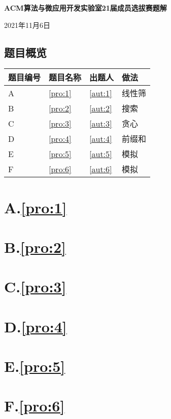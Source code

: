 \documentclass[
	lang=cn,
	color=blue
]{elegantbook}
\begin{document}
\begin{titlepage}
    \begin{center}
		\LARGE
		\textbf{ACM算法与微应用开发实验室21届成员选拔赛题解} \par
		\normalsize
		\vspace{0.5cm}
		2021年11月6日
	\end{center}

    \section*{题目概览}
    \begin{center}
        \begin{tabularx}{\textwidth}{M|M|M|M}
            \toprule
            \textbf{题目编号} & \textbf{题目名称} &\textbf{出题人} & \textbf{做法} \\
            \midrule
            A & \ref*{pro:1} & \ref*{aut:1} &线性筛 \\
            B & \ref*{pro:2} & \ref*{aut:2} &搜索 \\
            C & \ref*{pro:3} & \ref*{aut:3} &贪心 \\
            D & \ref*{pro:4} & \ref*{aut:4} &前缀和 \\
            E & \ref*{pro:5} & \ref*{aut:5} &模拟 \\
            F & \ref*{pro:6} & \ref*{aut:6} &模拟\\
            \bottomrule
        \end{tabularx}
    \end{center}
\end{titlepage}

\chapter*{A.\quad \ref*{pro:1}}

\chapter*{B.\quad \ref*{pro:2}}

\chapter*{C.\quad \ref*{pro:3}}

\chapter*{D.\quad \ref*{pro:4}}

\chapter*{E.\quad \ref*{pro:5}}

\chapter*{F.\quad \ref*{pro:6}}
\end{document}
